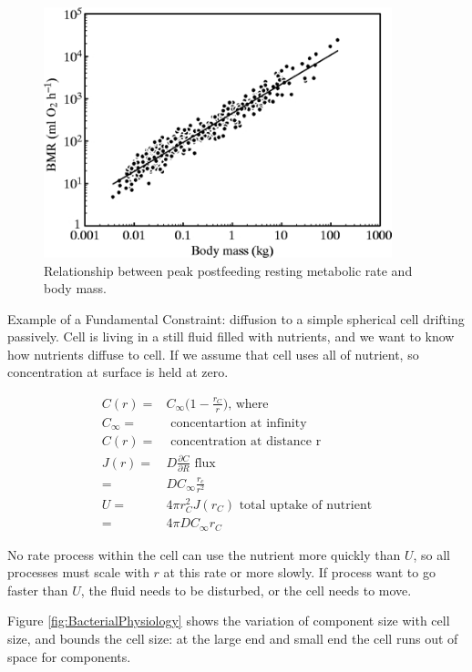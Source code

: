 \documentclass[]{article}
\begin{document}
\begin{figure}[H]
	\caption{Relationship between peak postfeeding resting metabolic rate and body mass.}\label{fig:allometric:scaling}
	\includegraphics[width=0.9\textwidth]{WhiteSeymour}
\end{figure}


Example of a Fundamental Constraint: diffusion to a simple spherical cell drifting passively. Cell is living in a still fluid filled with nutrients, and we want to know how nutrients diffuse to cell. If we assume that cell uses all of nutrient, so concentration at surface is held at zero.

\begin{align*}
C(r) =& C_{\infty}\big(1 - \frac{r_C}{r}\big)\text{, where}\\
C_{\infty} =& \text{ concentartion at infinity}\\
C(r) =& \text{ concentration at distance r}\\
J(r) =& D\frac{\partial C}{\partial R} \text{ flux}\\
  =& D C_{\infty} \frac{r_c}{r^2}\\
U =& 4 \pi r_C^2 J(r_C) \text{ total uptake of nutrient}\\
=&4 \pi D C_{\infty} r_C 
\end{align*}

No rate process within the cell can use the nutrient more quickly than $U$, so all processes must scale with $r$ at this rate or more slowly. If process want to go faster than $U$, the fluid needs to be disturbed, or the cell needs to move.

Figure \ref{fig:BacterialPhysiology} shows the variation of component size with cell size\cite{kempes2016evolutionary}, and bounds the cell size: at the large end and small end the cell runs out of space for components.
\end{document}
